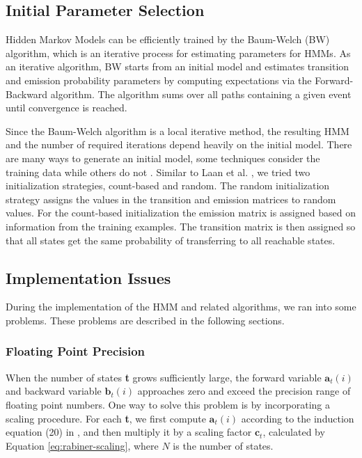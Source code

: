 \subsection{Initial Parameter Selection}

Hidden Markov Models can be efficiently trained by the Baum-Welch (BW) algorithm, which is an iterative process for estimating parameters for HMMs. 
As an iterative algorithm, BW starts from an initial model and estimates transition and emission probability parameters by computing expectations via the Forward-Backward algorithm.
The algorithm sums over all paths containing a given event until convergence is reached.

Since the Baum-Welch algorithm is a local iterative method, the resulting HMM and the number of required iterations depend heavily on the initial model. 
There are many ways to generate an initial model, some techniques consider the training data while others do not \cite{Laan}.
Similar to Laan et al. \cite{Laan}, we tried two initialization strategies, count-based and random.
The random initialization strategy assigns the values in the transition and emission matrices to random values.
For the count-based initialization the emission matrix is assigned based on information from the training examples. The transition matrix is then assigned so that all states get the same probability of transferring to all reachable states.

\subsection{Implementation Issues}

During the implementation of the HMM and related algorithms, we ran into some problems. These problems are described in the following sections.

\subsubsection{Floating Point Precision}

When the number of states \textbf{t} grows sufficiently large, the forward variable $\textbf{a}_t(i)$ and backward variable  $\textbf{b}_t(i)$ approaches zero and exceed the precision range of floating point numbers.
One way to solve this problem is by incorporating a scaling procedure.
For each \textbf{t}, we first compute $\textbf{a}_t(i)$ according to the induction equation (20) in  \cite{Rabiner1989}, and then multiply it by a scaling factor  $\textbf{c}_t$, calculated by Equation \ref{eq:rabiner-scaling}, where $N$ is the number of states.

